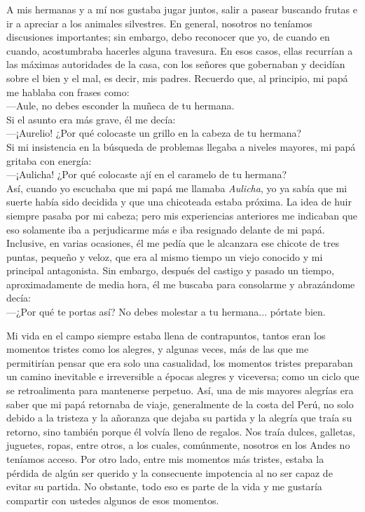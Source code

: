 A mis hermanas y a mí nos gustaba jugar juntos, salir a pasear buscando frutas e ir a apreciar a los animales silvestres. En general, nosotros no teníamos discusiones importantes; sin embargo, debo reconocer que yo, de cuando en cuando, acostumbraba hacerles alguna travesura.
En esos casos, ellas recurrían a las máximas autoridades de la casa, con los señores que gobernaban y decidían sobre el bien y el mal, es decir, mis padres. 
Recuerdo que, al principio, mi papá me hablaba con frases como:\\\indent
---Aule, no debes esconder la muñeca de tu hermana.\\\indent
Si el asunto era más grave, él me decía: \\\indent
---¡Aurelio! ¿Por qué colocaste un grillo en la cabeza de tu hermana?\\\indent
Si mi insistencia en la búsqueda de problemas llegaba a niveles mayores, mi papá gritaba con energía:\\\indent
---¡Aulicha! ¿Por qué colocaste ají en el caramelo de tu hermana?\\\indent
Así, cuando yo escuchaba que mi papá me llamaba \textit{Aulicha}, yo ya sabía que mi suerte había sido decidida y que una chicoteada estaba próxima. La idea de huir siempre pasaba por mi cabeza; pero mis experiencias anteriores me indicaban que eso solamente iba a perjudicarme más e iba resignado delante de mi papá. Inclusive, en varias ocasiones, él me pedía que le alcanzara ese chicote de tres puntas, pequeño y veloz, que era al mismo tiempo un viejo conocido y mi principal antagonista. 
Sin embargo, después del castigo y pasado un tiempo, aproximadamente de media hora,
él me buscaba para consolarme y abrazándome decía:\\\indent
---¿Por qué te portas así? No debes molestar a tu hermana... pórtate bien.

Mi vida en el campo siempre estaba llena de contrapuntos, tantos eran los momentos tristes como los alegres, y  algunas veces, más de las que me permitirían pensar que era solo una casualidad, los momentos tristes preparaban un camino inevitable e irreversible a épocas alegres y viceversa; como un ciclo que se retroalimenta para mantenerse perpetuo.
Así, una de mis mayores alegrías era saber que mi papá retornaba de viaje, generalmente de la costa del Perú, no solo debido a la tristeza y la añoranza que dejaba su partida y la alegría que traía su retorno, sino también porque él volvía lleno de regalos. 
Nos traía dulces, galletas, juguetes, ropas, entre otros, a los cuales, comúnmente, nosotros en los Andes no teníamos acceso.
Por otro lado, entre mis momentos más tristes, estaba la pérdida de algún ser querido y la consecuente impotencia al no ser capaz de evitar su partida.
No obstante, todo eso es parte de la vida y me gustaría compartir con ustedes algunos de esos momentos.





